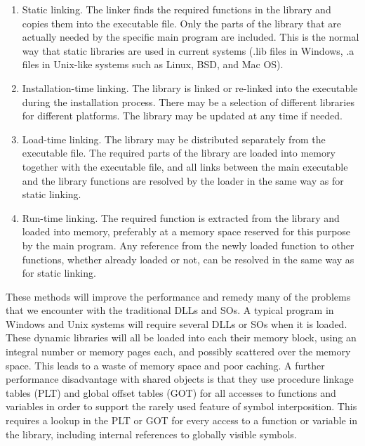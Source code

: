 \documentclass[forwardcom.tex]{subfiles}
\begin{document}
\begin{enumerate}
\item Static linking. \label{staticLinking} The linker finds the required functions in the library and copies them into the executable file. Only the parts of the library that are actually needed by the specific main program are included. This is the normal way that static libraries are used in current systems (.lib files in Windows, .a files in Unix-like systems such as Linux, BSD, and Mac OS). 

\item  Installation-time linking. \label{installationTimeLinking} The library is linked or re-linked into the executable during the installation process. There may be a selection of different libraries for different platforms. The library may be updated at any time if needed.

\item  Load-time linking. \label{loadTimeLinking} The library may be distributed separately from the executable file. The required parts of the library are loaded into memory together with the executable file, and all links between the main executable and the library functions are resolved by the loader in the same way as for static linking. 

\item  Run-time linking. \label{runtimeLinking} The required function is extracted from the library and loaded into memory, preferably at a memory space reserved for this purpose by the main program. Any reference from the newly loaded function to other functions, whether already loaded or not, can be resolved in the same way as for static linking. 
\end{enumerate}

These methods will improve the performance and remedy many of the problems that we encounter with the traditional DLLs and SOs. A typical program in Windows and Unix systems will require several DLLs or SOs when it is loaded. These dynamic libraries will all be loaded into each their memory block, using an integral number or memory pages each, and possibly scattered over the memory space. This leads to a waste of memory space and poor caching. A further performance disadvantage with shared objects is that they use procedure linkage tables (PLT) and global offset tables (GOT) for all accesses to functions and variables in order to support the rarely used feature of symbol interposition. This requires a lookup in the PLT or GOT for every access to a function or variable in the library, including internal references to globally visible symbols.
\vspace{2mm}
\end{document}
